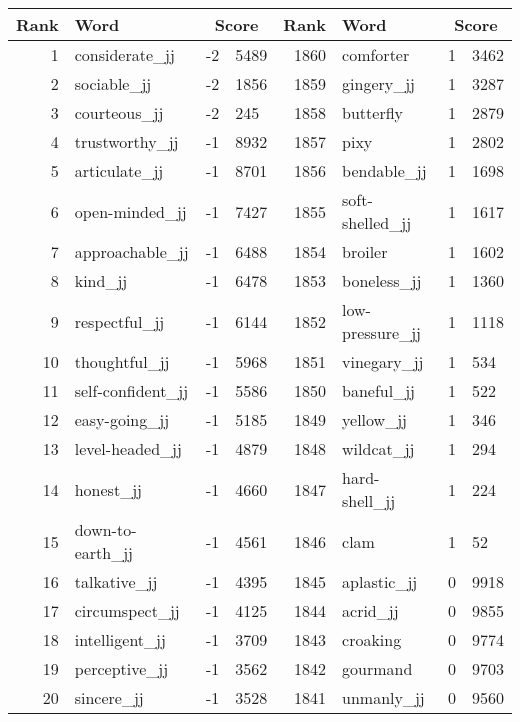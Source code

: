 \begin{table}[tbp]
    \begin{tabular}{| rlr@{.}l | rlr@{.}l |}
    \hline
    \textbf{Rank} & \textbf{Word} & \multicolumn{2}{c|}{\textbf{Score}} & \textbf{Rank} & \textbf{Word} & \multicolumn{2}{c|}{\textbf{Score}} \\
    \hline
    1 & considerate\_jj & -2 & 5489    &    1860 & comforter & 1 & 3462 \\
    2 & sociable\_jj & -2 & 1856    &    1859 & gingery\_jj & 1 & 3287 \\
    3 & courteous\_jj & -2 & 245    &    1858 & butterfly & 1 & 2879 \\
    4 & trustworthy\_jj & -1 & 8932    &    1857 & pixy & 1 & 2802 \\
    5 & articulate\_jj & -1 & 8701    &    1856 & bendable\_jj & 1 & 1698 \\
    6 & open-minded\_jj & -1 & 7427    &    1855 & soft-shelled\_jj & 1 & 1617 \\
    7 & approachable\_jj & -1 & 6488    &    1854 & broiler & 1 & 1602 \\
    8 & kind\_jj & -1 & 6478    &    1853 & boneless\_jj & 1 & 1360 \\
    9 & respectful\_jj & -1 & 6144    &    1852 & low-pressure\_jj & 1 & 1118 \\
    10 & thoughtful\_jj & -1 & 5968    &    1851 & vinegary\_jj & 1 & 534 \\
    11 & self-confident\_jj & -1 & 5586    &    1850 & baneful\_jj & 1 & 522 \\
    12 & easy-going\_jj & -1 & 5185    &    1849 & yellow\_jj & 1 & 346 \\
    13 & level-headed\_jj & -1 & 4879    &    1848 & wildcat\_jj & 1 & 294 \\
    14 & honest\_jj & -1 & 4660    &    1847 & hard-shell\_jj & 1 & 224 \\
    15 & down-to-earth\_jj & -1 & 4561    &    1846 & clam & 1 & 52 \\
    16 & talkative\_jj & -1 & 4395    &    1845 & aplastic\_jj & 0 & 9918 \\
    17 & circumspect\_jj & -1 & 4125    &    1844 & acrid\_jj & 0 & 9855 \\
    18 & intelligent\_jj & -1 & 3709    &    1843 & croaking & 0 & 9774 \\
    19 & perceptive\_jj & -1 & 3562    &    1842 & gourmand & 0 & 9703 \\
    20 & sincere\_jj & -1 & 3528    &    1841 & unmanly\_jj & 0 & 9560 \\

\end{tabular}
\end{table}
